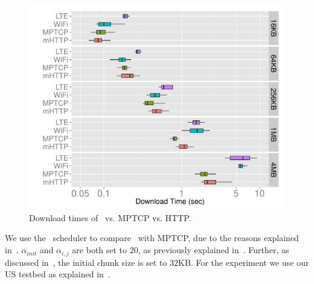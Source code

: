 \begin{figure}[!htb]
    \begin{minipage}[t]{0.8\linewidth}
	\begin{center}
        \includegraphics[width=\linewidth]{Figures/umass-mhttp-mptcp-stcp-32k.pdf}
		\caption{\label{fig:evaluation-mptcp-times}Download times of \mhttp~vs. MPTCP vs. HTTP.}
    \end{center}
    \end{minipage}
\vspace*{-0.3cm}
\end{figure}

We use the \algslice~scheduler to compare \mhttp~with MPTCP, due to the reasons explained in~.
$\alpha_{init}$ and $\alpha_{i,j}$ are both set to $20$, as previously explained in~. 
Further, as discussed in~, the initial chunk size is set to $32$KB.
For the experiment we use our US testbed as explained in~. 

